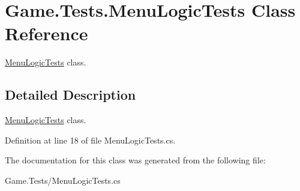 \hypertarget{class_game_1_1_tests_1_1_menu_logic_tests}{}\section{Game.\+Tests.\+Menu\+Logic\+Tests Class Reference}
\label{class_game_1_1_tests_1_1_menu_logic_tests}


\mbox{\hyperlink{class_game_1_1_tests_1_1_menu_logic_tests}{Menu\+Logic\+Tests}} class.  




\subsection{Detailed Description}
\mbox{\hyperlink{class_game_1_1_tests_1_1_menu_logic_tests}{Menu\+Logic\+Tests}} class. 



Definition at line 18 of file Menu\+Logic\+Tests.\+cs.



The documentation for this class was generated from the following file\+:\begin{DoxyCompactItemize}
\item 
Game.\+Tests/Menu\+Logic\+Tests.\+cs\end{DoxyCompactItemize}
